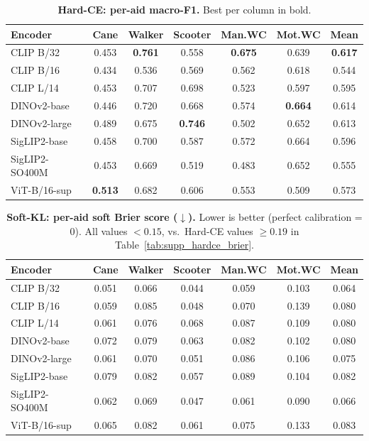 \documentclass{article}
\begin{document}
\begin{table}[!ht]
\caption{\textbf{Hard-CE: per-aid macro-F1.} Best per column in bold.}
\label{tab:supp_hardce_f1}
\centering\scriptsize
\setlength{\tabcolsep}{4pt}
\begin{tabular}{@{}lcccccc@{}}
\toprule
\textbf{Encoder} & \textbf{Cane} & \textbf{Walker} & \textbf{Scooter} & \textbf{Man.WC} & \textbf{Mot.WC} & \textbf{Mean} \\
\midrule
CLIP B/32      & 0.453 & \textbf{0.761} & 0.558 & \textbf{0.675} & 0.639 & \textbf{0.617} \\
CLIP B/16      & 0.434 & 0.536 & 0.569 & 0.562 & 0.618 & 0.544 \\
CLIP L/14      & 0.453 & 0.707 & 0.698 & 0.523 & 0.597 & 0.595 \\
DINOv2-base    & 0.446 & 0.720 & 0.668 & 0.574 & \textbf{0.664} & 0.614 \\
DINOv2-large   & 0.489 & 0.675 & \textbf{0.746} & 0.502 & 0.652 & 0.613 \\
SigLIP2-base   & 0.458 & 0.700 & 0.587 & 0.572 & 0.664 & 0.596 \\
SigLIP2-SO400M & 0.453 & 0.669 & 0.519 & 0.483 & 0.652 & 0.555 \\
ViT-B/16-sup   & \textbf{0.513} & 0.682 & 0.606 & 0.553 & 0.509 & 0.573 \\
\bottomrule
\end{tabular}
\end{table}

\begin{table}[!ht]
\caption{\textbf{Soft-KL: per-aid soft Brier score ($\downarrow$).} Lower is better (perfect calibration = 0). All values $<0.15$, vs.\ Hard-CE values $\geq 0.19$ in Table~\ref{tab:supp_hardce_brier}.}
\label{tab:supp_softkl_brier}
\centering\scriptsize
\setlength{\tabcolsep}{4pt}
\begin{tabular}{@{}lcccccc@{}}
\toprule
\textbf{Encoder} & \textbf{Cane} & \textbf{Walker} & \textbf{Scooter} & \textbf{Man.WC} & \textbf{Mot.WC} & \textbf{Mean} \\
\midrule
CLIP B/32      & 0.051 & 0.066 & 0.044 & 0.059 & 0.103 & 0.064 \\
CLIP B/16      & 0.059 & 0.085 & 0.048 & 0.070 & 0.139 & 0.080 \\
CLIP L/14      & 0.061 & 0.076 & 0.068 & 0.087 & 0.109 & 0.080 \\
DINOv2-base    & 0.072 & 0.079 & 0.063 & 0.082 & 0.102 & 0.080 \\
DINOv2-large   & 0.061 & 0.070 & 0.051 & 0.086 & 0.106 & 0.075 \\
SigLIP2-base   & 0.079 & 0.082 & 0.057 & 0.089 & 0.104 & 0.082 \\
SigLIP2-SO400M & 0.062 & 0.069 & 0.047 & 0.061 & 0.090 & 0.066 \\
ViT-B/16-sup   & 0.065 & 0.082 & 0.061 & 0.075 & 0.133 & 0.083 \\
\bottomrule
\end{tabular}
\end{table}
\end{document}
